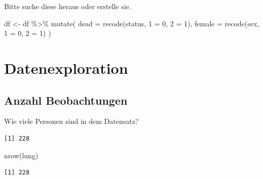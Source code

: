 \documentclass[
  letterpaper,
  DIV=11,
  numbers=noendperiod]{scrartcl}
\newenvironment{Shaded}{\begin{snugshade}}{\end{snugshade}}
\newcommand{\AttributeTok}[1]{\textcolor[rgb]{0.40,0.45,0.13}{#1}}
\newcommand{\DecValTok}[1]{\textcolor[rgb]{0.68,0.00,0.00}{#1}}
\newcommand{\FunctionTok}[1]{\textcolor[rgb]{0.28,0.35,0.67}{#1}}
\newcommand{\NormalTok}[1]{\textcolor[rgb]{0.00,0.23,0.31}{#1}}
\newcommand{\OtherTok}[1]{\textcolor[rgb]{0.00,0.23,0.31}{#1}}
\newcommand{\SpecialCharTok}[1]{\textcolor[rgb]{0.37,0.37,0.37}{#1}}
\newcommand{\StringTok}[1]{\textcolor[rgb]{0.13,0.47,0.30}{#1}}
\begin{document}
Bitte suche diese heraus oder erstelle sie.

\begin{Shaded}
\begin{Highlighting}[]
\NormalTok{df }\OtherTok{\textless{}{-}}\NormalTok{ df }\SpecialCharTok{\%\textgreater{}\%} 
  \FunctionTok{mutate}\NormalTok{(}
    \AttributeTok{dead =} \FunctionTok{recode}\NormalTok{(status, }\StringTok{\textasciigrave{}}\AttributeTok{1}\StringTok{\textasciigrave{}} \OtherTok{=} \DecValTok{0}\NormalTok{, }\StringTok{\textasciigrave{}}\AttributeTok{2}\StringTok{\textasciigrave{}} \OtherTok{=} \DecValTok{1}\NormalTok{),}
    \AttributeTok{female =} \FunctionTok{recode}\NormalTok{(sex, }\StringTok{\textasciigrave{}}\AttributeTok{1}\StringTok{\textasciigrave{}} \OtherTok{=} \DecValTok{0}\NormalTok{, }\StringTok{\textasciigrave{}}\AttributeTok{2}\StringTok{\textasciigrave{}} \OtherTok{=} \DecValTok{1}\NormalTok{)}
\NormalTok{  )}
\end{Highlighting}
\end{Shaded}

\section{Datenexploration}\label{datenexploration}

\subsection{Anzahl Beobachtungen}\label{anzahl-beobachtungen}

Wie viele Personen sind in dem Datensatz?

\begin{Shaded}
\end{Shaded}

\begin{verbatim}
[1] 228
\end{verbatim}

\begin{Shaded}
\begin{Highlighting}[]
\FunctionTok{nrow}\NormalTok{(lung)}
\end{Highlighting}
\end{Shaded}

\begin{verbatim}
[1] 228
\end{verbatim}
\end{document}

